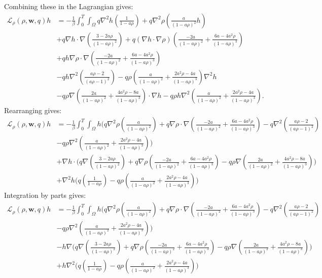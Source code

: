 \documentclass[11pt, a4paper]{article}
\theoremstyle{definition}
\newcommand{\w}{\mathbf{w}}
\begin{document}
Combining these in the Lagrangian gives:
\begin{align*}
	\mathcal{L}_\rho(\rho,\w,q)h &= -\frac{1}{\beta}\int_0^T \int_\Omega q \nabla^2 h \left(\frac{1}{1- a\rho} \right) + q\nabla^2 \rho \left(\frac{a}{(1- a\rho)^2}h\right)\\
	&+ q\nabla h \cdot \nabla \left( \frac{3-2a\rho}{(1-a\rho)^2} \right) + q\left(\nabla h \cdot \nabla \rho \right) \left( \frac{-2a }{(1-a\rho)^2} + \frac{6a-4a^2  \rho}{(1-a\rho)^3}  \right) \\
	&+ qh \nabla \rho \cdot \nabla \left(\frac{-2a }{(1-a\rho)^2} + \frac{6a-4a^2  \rho}{(1-a\rho)^3}  \right)\\
	&- qh \nabla^2 \left(\frac{a\rho -2}{(a\rho -1)^2}\right) - q\rho  \left(\frac{a }{(1-a\rho)^2} + \frac{2a^2\rho -4a}{(1-a\rho)^3} \right)\nabla^2 h \\
	&- q\rho \nabla \left(\frac{2a }{(1-a\rho)^2} + \frac{4a^2\rho -8a}{(1-a\rho)^3} \right) \cdot \nabla h - q\rho h \nabla^2  \left(\frac{a }{(1-a\rho)^2} + \frac{2a^2\rho -4a}{(1-a\rho)^3} \right).
\end{align*}
Rearranging gives:
\begin{align*}
	\mathcal{L}_\rho(\rho,\w,q)h &= -\frac{1}{\beta}\int_0^T \int_\Omega h \bigg(q\nabla^2 \rho \left(\frac{a}{(1- a\rho)^2}\right)  + q \nabla \rho \cdot \nabla \left(\frac{-2a }{(1-a\rho)^2} + \frac{6a-4a^2  \rho}{(1-a\rho)^3}  \right) - q \nabla^2 \left(\frac{a\rho -2}{(a\rho -1)^2}\right)\\
	&- q\rho  \nabla^2  \left(\frac{a }{(1-a\rho)^2} + \frac{2a^2\rho -4a}{(1-a\rho)^3} \right)\bigg)\\
	&+ \nabla h \cdot \bigg( q  \nabla \left( \frac{3-2a\rho}{(1-a\rho)^2} \right) + q \nabla \rho  \left( \frac{-2a }{(1-a\rho)^2} + \frac{6a-4a^2  \rho}{(1-a\rho)^3}  \right)- q\rho \nabla \left(\frac{2a }{(1-a\rho)^2} + \frac{4a^2\rho -8a}{(1-a\rho)^3} \right) \bigg)\\
	&+ \nabla^2 h \bigg(q \left(\frac{1}{1- a\rho} \right)  - q\rho  \left(\frac{a }{(1-a\rho)^2} + \frac{2a^2\rho -4a}{(1-a\rho)^3} \right)  \bigg)
\end{align*}
Integration by parts gives:
\begin{align*}
	\mathcal{L}_\rho(\rho,\w,q)h &= -\frac{1}{\beta}\int_0^T \int_\Omega h \bigg(q\nabla^2 \rho \left(\frac{a}{(1- a\rho)^2}\right)  + q \nabla \rho \cdot \nabla \left(\frac{-2a }{(1-a\rho)^2} + \frac{6a-4a^2  \rho}{(1-a\rho)^3} \right) - q \nabla^2 \left(\frac{a\rho -2}{(a\rho -1)^2}\right)\\
	&- q\rho  \nabla^2  \left(\frac{a }{(1-a\rho)^2} + \frac{2a^2\rho -4a}{(1-a\rho)^3} \right)\bigg)\\
	&-  h \nabla \bigg( q  \nabla \left( \frac{3-2a\rho}{(1-a\rho)^2} \right) + q \nabla \rho  \left( \frac{-2a }{(1-a\rho)^2} + \frac{6a-4a^2  \rho}{(1-a\rho)^3}  \right)- q\rho \nabla \left(\frac{2a }{(1-a\rho)^2} + \frac{4a^2\rho -8a}{(1-a\rho)^3} \right) \bigg)\\
	&+  h \nabla^2\bigg(q \left(\frac{1}{1- a\rho} \right)  - q\rho  \left(\frac{a }{(1-a\rho)^2} + \frac{2a^2\rho -4a}{(1-a\rho)^3} \right)  \bigg)
\end{align*}
\end{document}
